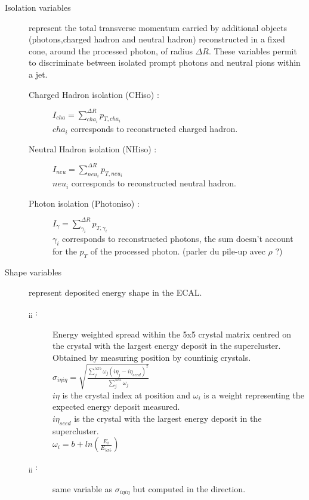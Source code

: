 \begin{description}
    \item [Isolation variables] represent the total transverse momentum carried by additional objects (photons,charged hadron and neutral hadron) reconstructed
    in a fixed cone, around the processed photon, of radius $\Delta R$. These variables permit to discriminate between isolated
    prompt photons and neutral pions within a jet.
    \begin{description}
	    \item [Charged Hadron isolation (CHiso) : ] $I_{cha} = \sum_{cha_i}^{\Delta R}{p_{T,cha_i}}$ \\
            $cha_i$ corresponds to reconstructed charged hadron.
	    \item [Neutral Hadron isolation (NHiso) : ] $I_{neu} = \sum_{neu_i}^{\Delta R}{p_{T,neu_i}}$ \\
            $neu_i$ corresponds to reconstructed neutral hadron.
        \item [Photon isolation (Photoniso) : ] $I_\gamma = \sum_{\gamma_i}^{\Delta R}{p_{T,\gamma_i}}$ \\
            $\gamma_i$ corresponds to reconstructed photons, the sum doesn't account for the $p_T$ of the processed
            photon. (parler du pile-up avec $\rho$ ?)
	\\
    \end{description}
    \item [Shape variables] represent deposited energy shape in the ECAL.
    \begin{description}
    	\item [\textsigma\textsubscript{i\texteta i\texteta} :] Energy weighted spread within the 5x5 crystal matrix centred on the crystal with the largest energy deposit in the supercluster. Obtained by measuring position by countinig crystals. \\
		$ \sigma_{i \eta i \eta} = \sqrt{\frac{\sum^{5x5}_{j}\omega_j (i \eta_j - i \eta_{seed})^2}{\sum^{5x5}_{j}\omega_j}}$ \\
		$i \eta$ is the crystal index at position \texteta and $\omega_i$ is a weight representing the expected energy deposit measured.\\
		$i\eta_{seed} $ is the crystal with the largest energy deposit in the supercluster.\\
		$\omega_i = b + ln(\frac{E_i}{E_{5x5}})$
		\item [\textsigma\textsubscript{i\textphi i\textphi} :] same variable as $ \sigma_{i \eta i \eta}$ but computed in the \textphi direction.

\end{description}
\end{description}
